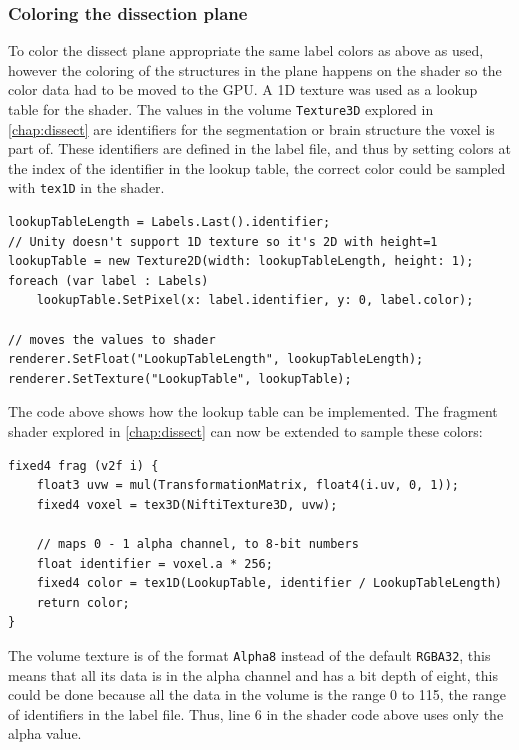 \subsubsection*{Coloring the dissection plane}
To color the dissect plane appropriate the same label colors as above as used, however the coloring of the structures in the plane happens on the shader so the color data had to be moved to the GPU. A 1D texture was used as a lookup table for the shader. The values in the volume \texttt{Texture3D} explored in \autoref{chap:dissect} are identifiers for the segmentation or brain structure the voxel is part of. These identifiers are defined in the label file, and thus by setting colors at the index of the identifier in the lookup table, the correct color could be sampled with \texttt{tex1D} in the shader.

\begin{lstlisting}
lookupTableLength = Labels.Last().identifier;
// Unity doesn't support 1D texture so it's 2D with height=1 
lookupTable = new Texture2D(width: lookupTableLength, height: 1);
foreach (var label : Labels)
    lookupTable.SetPixel(x: label.identifier, y: 0, label.color);

// moves the values to shader
renderer.SetFloat("LookupTableLength", lookupTableLength);
renderer.SetTexture("LookupTable", lookupTable);
\end{lstlisting}

The code above shows how the lookup table can be implemented. The fragment shader explored in \autoref{chap:dissect} can now be extended to sample these colors:
\begin{lstlisting}
fixed4 frag (v2f i) {
    float3 uvw = mul(TransformationMatrix, float4(i.uv, 0, 1));
    fixed4 voxel = tex3D(NiftiTexture3D, uvw);

    // maps 0 - 1 alpha channel, to 8-bit numbers
    float identifier = voxel.a * 256; 
    fixed4 color = tex1D(LookupTable, identifier / LookupTableLength)
    return color;
}
\end{lstlisting}

The volume texture is of the format \texttt{Alpha8} instead of the default \texttt{RGBA32}, this means that all its data is in the alpha channel and has a bit depth of eight, this could be done because all the data in the volume is the range 0 to 115, the range of identifiers in the label file. Thus, line 6 in the shader code above uses only the alpha value. 



